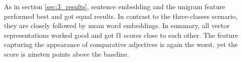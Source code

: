 %

As in section \ref{sec:3_results}, sentence embedding and the unigram feature performed best and got equal results. In contrast to the three-classes scenario, they are closely followed by mean word embeddings. In summary, all vector representations worked good and got f1 scores close to each other. The feature capturing the appearance of comparative adjectives is again the worst, yet the score is nineten points above the baseline.



